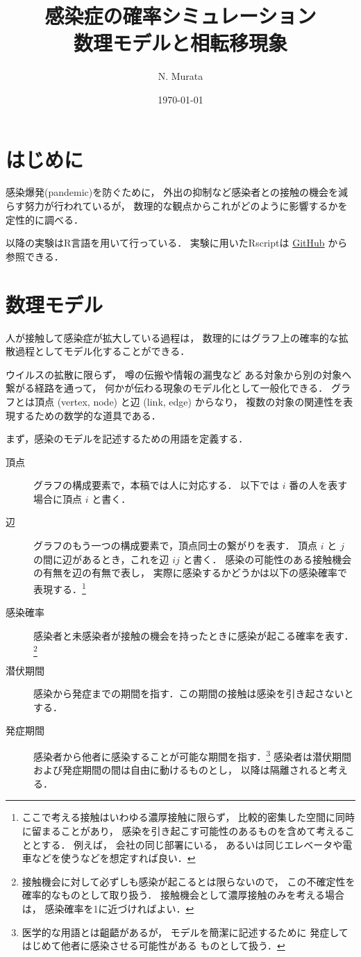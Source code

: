\documentclass[10pt,oneside]{scrartcl}
\author{N. Murata}
\date{\today}
\title{感染症の確率シミュレーション\\\medskip
\large 数理モデルと相転移現象}
\begin{document}
\maketitle

\section{はじめに}
\label{sec:org748e008}

感染爆発(pandemic)を防ぐために，
外出の抑制など感染者との接触の機会を減らす努力が行われているが，
数理的な観点からこれがどのように影響するかを定性的に調べる．

以降の実験はR言語を用いて行っている．
実験に用いたRscriptは
\href{https://github.com/noboru-murata/epidemic-model}{GitHub}
から参照できる．

\section{数理モデル}
\label{sec:orgffc7d78}
人が接触して感染症が拡大している過程は，
数理的にはグラフ上の確率的な拡散過程としてモデル化することができる．

ウイルスの拡散に限らず，
噂の伝搬や情報の漏曳など
ある対象から別の対象へ繋がる経路を通って，
何かが伝わる現象のモデル化として一般化できる．
グラフとは頂点 (vertex, node) と辺 (link, edge) からなり，
複数の対象の関連性を表現するための数学的な道具である．

まず，感染のモデルを記述するための用語を定義する．
\begin{description}
\item[{頂点}] グラフの構成要素で，本稿では人に対応する．
以下では \(i\) 番の人を表す場合に頂点 \(i\) と書く．
\item[{辺}] グラフのもう一つの構成要素で，頂点同士の繋がりを表す．
頂点 \(i\) と \(j\) の間に辺があるとき，これを辺 \(ij\) と書く．
感染の可能性のある接触機会の有無を辺の有無で表し，
実際に感染するかどうかは以下の感染確率で表現する．\footnote{ここで考える接触はいわゆる濃厚接触に限らず，
比較的密集した空間に同時に留まることがあり，
感染を引き起こす可能性のあるものを含めて考えることとする．
例えば，
会社の同じ部署にいる，
あるいは同じエレベータや電車などを使うなどを想定すれば良い．}
\item[{感染確率}] 感染者と未感染者が接触の機会を持ったときに感染が起こる確率を表す．\footnote{接触機会に対して必ずしも感染が起こるとは限らないので，
この不確定性を確率的なものとして取り扱う．
接触機会として濃厚接触のみを考える場合は，
感染確率を1に近づければよい．}
\item[{潜伏期間}] 感染から発症までの期間を指す．この期間の接触は感染を引き起さないとする．
\item[{発症期間}] 感染者から他者に感染することが可能な期間を指す．\footnote{医学的な用語とは齟齬があるが，
モデルを簡潔に記述するために
発症してはじめて他者に感染させる可能性がある
ものとして扱う．}
感染者は潜伏期間および発症期間の間は自由に動けるものとし，
以降は隔離されると考える．
\end{description}
\end{document}
